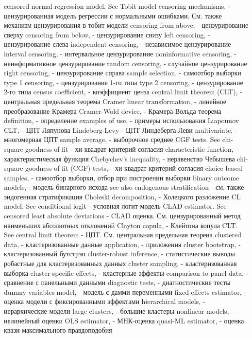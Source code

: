 censored normal regression model. See Tobit model censoring mechanisms, - цензурированная модель регрессии с нормальными ошибками. См. также механизм цензурирования в тобит модели
censoring from above, - цензурирование сверху
censoring from below, - цензурирование снизу
left censoring, - цензурирование слева
independent censoring, - независимое цензурирование
interval censoring, - интервальное цензурирование
noninformative censoring, - неинформативное цензурирование
random censoring, - случайное цензурирование 
right censoring, - цензурирование справа
sample selection, - самоотбор выборки
type 1 censoring, - цензурирование 1-го типа
type 2 censoring, - цензурирование 2-го типа 
census coefficient, - коэффициент ценза
central limit theorem (CLT), - центральная предельная теорема
Cramer linear transformation, - линейное преобразование Крамера
Cramer-Wold device, - Крамера-Вольда теорема
definition, - определение
examples of use, - примеры использования 
Liapounov CLT, - ЦПТ Ляпунова 
Lindeberg-Levy - ЦПТ Линдеберга-Леви 
multivariate, - многомерная ЦПТ
sample average, - выборочное среднее
CGF tests. See chi-square goodness-of-fit - хи-квадрат критерий согласия
characteristic function, - характеристическая функция
Chebychev’s inequality, - неравенство Чебышева
chi-square goodness-of-fit (CGF) tests, - хи-квадрат критерий согласия
choice-based samples, - самоотбор выборки, отбор при построении выборки
binary outcome models, - модель бинарного исхода
see also endogenous stratification - см. также эндогенная стратификация
Choleski decomposition, - Холецкого разложение
CL model. See conditional logit - условная логит-модель
CLAD estimator. See censored least absolute deviations - CLAD оценка. См. цензурированный метод наименьших абсолютных отклонений
Clayton copula, - Клейтона копула
CLT. See central limit theorem - ЦПТ. См. центральная предельная теореиа
clustered data, - кластеризованные данные
application, - приложения
cluster bootstrap, - кластеризованный бутстрэп
cluster-robust inference, - статистические выводы робастные для кластеризованных данных
cluster sampling, - кластеризованная выборка
cluster-specific effects, - кластерные эффекты
comparison to panel data, - сравнение с панельными данными
diagnostic tests, - диагностические тесты
dummy variables model, - модель с дамми-переменными
fixed effects estimator, - оценка модели с фиксированными эффектами
hierarchical models, - иерархические модели
large clusters, - большие кластеры
nonlinear models, - нелинейный оценки
OLS estimator, - МНК-оценка
quasi-ML estimator, - оценка квази-максимального правдоподобия

